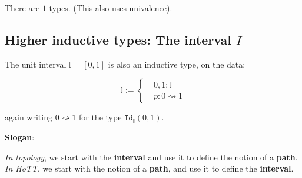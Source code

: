 \documentclass[11pt]{article}
\newcommand{\myemph}[1]{\textbf{#1}}    %
\newcommand{\id}[1]{\texttt{Id}_{#1}}
\begin{document}
\begin{corollary} There are  $1$-types. (This also uses univalence).
\end{corollary}

\subsection*{Higher inductive types: The interval $I$}

The unit interval $\mathbb{I} = [0,1]$ is also an inductive type, on the data:

\[
			\mathbb{I} :=  \begin{cases} 
						&0,1 : \mathbb{I}\\
						&p : 0\rightsquigarrow 1
						\end{cases}
\]

again writing $0\rightsquigarrow 1$ for the type $\id{\mathbb{I}}(0,1)$.

\bigskip

\textbf{Slogan}:
\smallskip

\emph{In topology}, we start with the \myemph{interval} and use it to define the notion of a \myemph{path}.\\
\smallskip
\emph{In HoTT}, we start with the notion of a \myemph{path}, and use it to define the \myemph{interval}.
\end{document}
